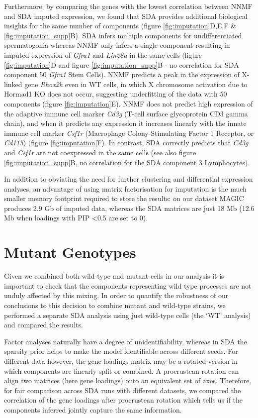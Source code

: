 Furthermore, by comparing the genes with the lowest correlation between NNMF and SDA imputed expression, we found that SDA provides additional biological insights for the same number of components (figure \ref{fig:imputation}D,E,F \& \ref{fig:imputation_supp}B).
SDA infers multiple components for undifferentiated spermatogonia whereas NNMF only infers a single component resulting in imputed expression of \textit{Gfra1} and \textit{Lin28a} in the same cells (figure \ref{fig:imputation}D and figure \ref{fig:imputation_supp}B - no correlation for SDA component 50 \textit{Gfra1} Stem Cells).
NNMF predicts a peak in the expression of X-linked gene \textit{Rhox2h} even in WT cells, in which X chromosome activation due to Hormad1 KO does not occur, suggesting underfitting of the data with 50 components (figure \ref{fig:imputation}E).
NNMF does not predict high expression of the adaptive immune cell marker \textit{Cd3g} (T-cell surface glycoprotein CD3 gamma chain), and when it predicts any expression it increases linearly with the innate immune cell marker \textit{Csf1r} (Macrophage Colony-Stimulating Factor 1 Receptor, or \textit{Cd115}) (figure \ref{fig:imputation}F).
In contrast, SDA correctly predicts that \textit{Cd3g} and \textit{Csf1r} are not coexpressed in the same cells (see also figure \ref{fig:imputation_supp}B, no correlation for the SDA component 3 Lymphocytes).

In addition to obviating the need for further clustering and differential expression analyses, an advantage of using matrix factorisation for imputation is the much smaller memory footprint required to store the results: on our dataset MAGIC produces 2.9 Gb of imputed data, whereas the SDA matrices are just 18 Mb (12.6 Mb when loadings with PIP <0.5 are set to 0).


\section{Mutant Genotypes}

Given we combined both wild-type and mutant cells in our analysis it is important to check that the components representing wild type processes are not unduly affected by this mixing.
In order to quantify the robustness of our conclusions to this decision to combine mutant and wild-type strains, we performed a separate SDA analysis using just wild-type cells (the ‘WT’ analysis) and compared the results.

Factor analyses naturally have a degree of unidentifiability, whereas in SDA the sparsity prior helps to make the model identifiable across different seeds.
For different data however, the gene loadings matrix may be a rotated version in which components are linearly split or combined.
A procrustean rotation can align two matrices (here gene loadings) onto an equivalent set of axes.
Therefore, for fair comparison across SDA runs with different datasets, we compared the correlation of the gene loadings after procrustean rotation which tells us if the components inferred jointly capture the same information.

